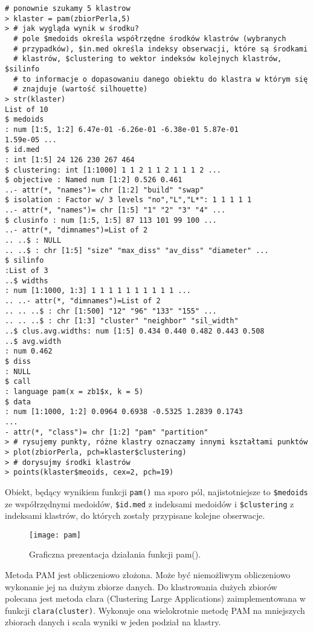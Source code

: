 \documentclass[polish,]{book}
\begin{document}
\begin{verbatim}
# ponownie szukamy 5 klastrow
> klaster = pam(zbiorPerla,5)
> # jak wygląda wynik w środku?
  # pole $medoids określa współrzędne środków klastrów (wybranych
  # przypadków), $in.med określa indeksy obserwacji, które są środkami
  # klastrów, $clustering to wektor indeksów kolejnych klastrów, $silinfo
  # to informacje o dopasowaniu danego obiektu do klastra w którym się
  # znajduje (wartość silhouette)
> str(klaster)
List of 10
$ medoids
: num [1:5, 1:2] 6.47e-01 -6.26e-01 -6.38e-01 5.87e-01
1.59e-05 ...
$ id.med
: int [1:5] 24 126 230 267 464
$ clustering: int [1:1000] 1 1 2 1 1 2 1 1 1 2 ...
$ objective : Named num [1:2] 0.526 0.461
..- attr(*, "names")= chr [1:2] "build" "swap"
$ isolation : Factor w/ 3 levels "no","L","L*": 1 1 1 1 1
..- attr(*, "names")= chr [1:5] "1" "2" "3" "4" ...
$ clusinfo : num [1:5, 1:5] 87 113 101 99 100 ...
..- attr(*, "dimnames")=List of 2
.. ..$ : NULL
.. ..$ : chr [1:5] "size" "max_diss" "av_diss" "diameter" ...
$ silinfo
:List of 3
..$ widths
: num [1:1000, 1:3] 1 1 1 1 1 1 1 1 1 1 ...
.. ..- attr(*, "dimnames")=List of 2
.. .. ..$ : chr [1:500] "12" "96" "133" "155" ...
.. .. ..$ : chr [1:3] "cluster" "neighbor" "sil_width"
..$ clus.avg.widths: num [1:5] 0.434 0.440 0.482 0.443 0.508
..$ avg.width
: num 0.462
$ diss
: NULL
$ call
: language pam(x = zb1$x, k = 5)
$ data
: num [1:1000, 1:2] 0.0964 0.6938 -0.5325 1.2839 0.1743
...
- attr(*, "class")= chr [1:2] "pam" "partition"
> # rysujemy punkty, różne klastry oznaczamy innymi kształtami punktów
> plot(zbiorPerla, pch=klaster$clustering)
> # dorysujmy środki klastrów
> points(klaster$meoids, cex=2, pch=19)
\end{verbatim}

Obiekt, będący wynikiem funkcji \texttt{pam()} ma sporo pól, najistotniejsze to \texttt{\$medoids}
ze współrzędnymi medoidów, \texttt{\$id.med} z indeksami medoidów i \texttt{\$clustering} z indeksami klastrów, do których zostały przypisane kolejne obserwacje.

\begin{figure}[h]

{\centering \texttt{[image: pam]} 

}

\caption{Graficzna prezentacja działania funkcji pam().}\label{fig:pam}
\end{figure}

Metoda PAM jest obliczeniowo złożona. Może być niemożliwym obliczeniowo
wykonanie jej na dużym zbiorze danych. Do klastrowania dużych zbiorów polecana jest metoda clara (Clustering Large Applications) zaimplementowana w funkcji
\texttt{clara(cluster)}. Wykonuje ona wielokrotnie metodę PAM na mniejszych zbiorach
danych i scala wyniki w jeden podział na klastry.
\end{document}
